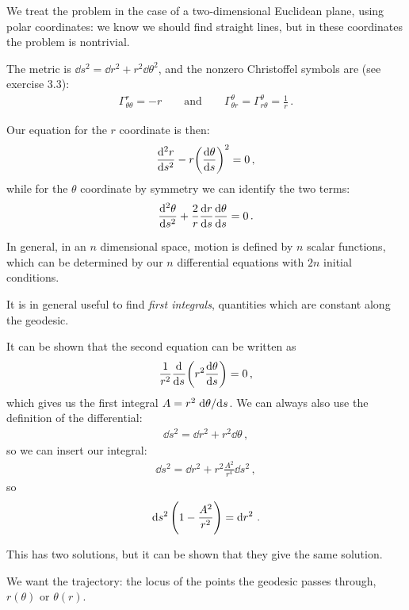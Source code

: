\documentclass[main.tex]{subfiles}
\begin{document}
We treat the problem in the case of a two-dimensional Euclidean plane, using polar coordinates: we know we should find straight lines, but in these coordinates the problem is nontrivial.

The metric is \(\dd{s^2} = \dd{r^2} + r^2 \dd{\theta^2}\), and the nonzero Christoffel symbols are (see exercise 3.3): 
%
\begin{align}
  \Gamma^{r}_{\theta \theta } = -r 
  \qquad \text{and} \qquad 
  \Gamma^{\theta }_{\theta r } = 
  \Gamma^{\theta }_{r \theta } = \frac{1}{r} 
\,.
\end{align}

Our equation for the \(r\) coordinate is then: 
%
\begin{align}
  \dv[2]{r}{s} - r \qty(\dv{\theta }{s})^2 = 0
\,,
\end{align}
%
while for the \(\theta \) coordinate by symmetry we can identify the two terms: 
%
\begin{align}
  \dv[2]{\theta }{s} + \frac{2}{r} \dv{r}{s} \dv{\theta }{s} =0
\,.
\end{align}

In general, in an \(n\) dimensional space, motion is defined by \(n\) scalar functions, which can be determined by our \(n\) differential equations with \(2n\) initial conditions.

It is in general useful to find \emph{first integrals}, quantities which are constant along the geodesic.

It can be shown that the second equation can be written as
%
\begin{align}
  \frac{1}{r^2} \dv[]{}{s} \qty(r^2 \dv{\theta }{s}) =0
\,,
\end{align}
%
which gives us the first integral \(A = r^2 \dv*{\theta }{s}\).
We can always also use the definition of the differential: 
%
\begin{align}
    \dd{s^2} = \dd{r^2} + r^2 \dd{\theta } 
    \,,
\end{align}
%
so we can insert our integral: 
%
\begin{align}
    \dd{s^2} = \dd{r^2} + r^2 \frac{A^2}{r^{4}} \dd{s^2}
\,,
\end{align}
%
so 
%
\begin{align}
  \dd{s^2} \qty(1- \frac{A^2}{r^2}) = \dd{r^2}
\,.
\end{align}

This has two solutions, but it can be shown that they give the same solution.

We want the trajectory: the locus of the points the geodesic passes through, \(r(\theta )\) or \(\theta (r)\).
\end{document}
